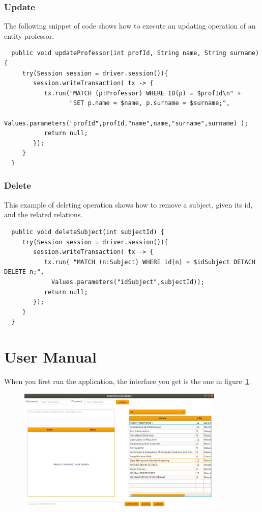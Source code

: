 \documentclass[a4paper]{article}
\begin{document}
\subsubsection{Update}
The following snippet of code shows how to execute an updating operation of an entity professor.
\begin{verbatim}
  public void updateProfessor(int profId, String name, String surname) {
     try(Session session = driver.session()){
        session.writeTransaction( tx -> {
           tx.run("MATCH (p:Professor) WHERE ID(p) = $profId\n" + 
                  "SET p.name = $name, p.surname = $surname;",
             Values.parameters("profId",profId,"name",name,"surname",surname) );
           return null;
        });
     }
  }
\end{verbatim}

\subsubsection{Delete}
This example of deleting operation shows how to remove a subject, given its id, and the related relations.

\begin{verbatim}
  public void deleteSubject(int subjectId) {
     try(Session session = driver.session()){
        session.writeTransaction( tx -> {
           tx.run( "MATCH (n:Subject) WHERE id(n) = $idSubject DETACH DELETE n;",
             Values.parameters("idSubject",subjectId));
           return null;
        });
     }
  }
\end{verbatim}
\clearpage
\section{User Manual}
When you first run the application, the interface you get is the one in figure~\ref{fig:screen0}. 

\begin{figure}[h]
\centering
\includegraphics[width=0.88\textwidth]{images/screens/screen0}
\label{fig:screen0}
\end{figure}
\end{document}
